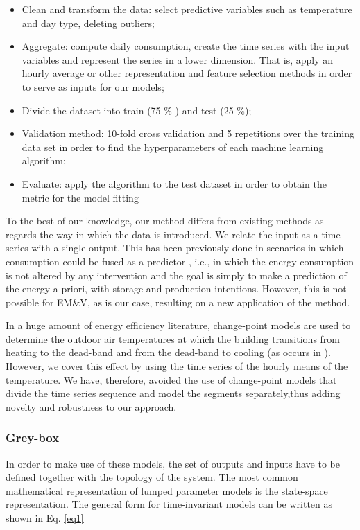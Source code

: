 \documentclass[10pt, conference, compsocconf]{IEEEtran}
\begin{document}
\begin{itemize}
\item Clean and transform the data: select predictive variables such as temperature and day type, deleting outliers; 
\item Aggregate: compute daily consumption, create the time series with the input variables and represent the series in a lower dimension. That is, apply an hourly average or other representation and feature selection methods in order to serve as inputs for our models;
\item Divide the dataset into train (75 \% ) and test (25 \%);
\item Validation method: 10-fold cross validation and 5 repetitions over the training data set in order to find the hyperparameters of each machine learning algorithm;
\item Evaluate: apply the algorithm to the test dataset in order to obtain the metric for the model fitting
\end{itemize}


To the best of our knowledge, our method differs from existing methods as regards the way in which the data is introduced. We relate the input as a time series with a single output. This has been previously done in scenarios in which consumption could be fused as a predictor \cite{ruijin2013building}, i.e., in which the energy consumption is not altered by any intervention and the goal is simply to make a prediction of the energy a priori, with storage and production intentions. However, this is not possible for EM\&V, as is our case, resulting on a new application of the method.

In a huge amount of energy efficiency literature, change-point models are used to determine the outdoor air temperatures at which the building transitions from heating to the dead-band and from the dead-band to cooling (as occurs in \cite{kissock1998ambient}). However, we cover this effect by using the time series of the hourly means of the temperature. We have, therefore, avoided the use of change-point models that divide the time series sequence and model the segments  separately,thus  adding novelty and robustness to our approach.


\subsubsection{ Grey-box}


In order to make use of these models, the set of outputs and inputs have to be defined together with the topology of the system. 
The most common mathematical representation of lumped parameter models is the state-space representation. The general form for time-invariant models can be written as shown in Eq. \ref{eq1}
\end{document}
